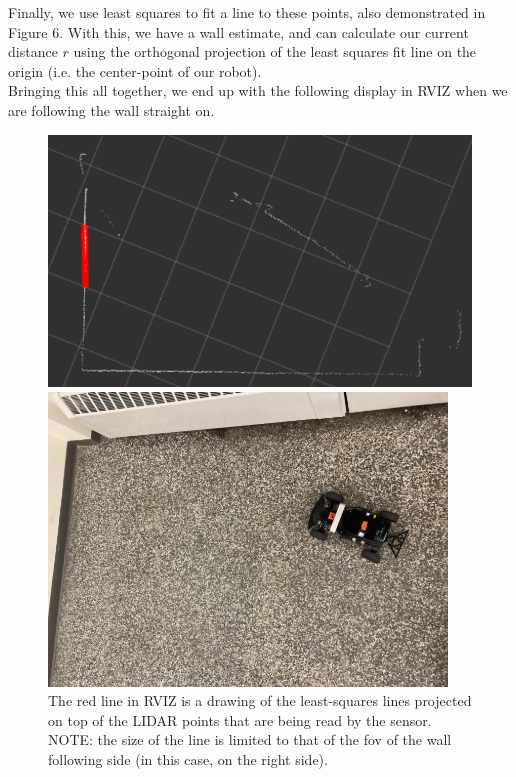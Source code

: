 \documentclass{article}
\begin{document}
Finally, we use least squares to fit a line to these points, also demonstrated in Figure 6. With this, we have a wall estimate, and can calculate our current distance $r$ using the orthogonal projection of the least squares fit line on the origin (i.e. the center-point of our robot).\\

Bringing this all together, we end up with the following display in RVIZ when we are following the wall straight on.\\

\begin{figure}[!h]
   \begin{minipage}{0.55\textwidth}
     \centering
     \includegraphics[width=1.0\linewidth]{scan_straight_rviz.png}
   \end{minipage}
   \begin{minipage}{0.45\textwidth}
     \centering
     \includegraphics[width=1.0\linewidth]{scan_straight_car.png}
   \end{minipage}
   \caption{The red line in RVIZ is a drawing of the least-squares lines projected on top of the LIDAR points that are being read by the sensor. NOTE: the size of the line is limited to that of the fov of the wall following side (in this case, on the right side).}
\end{figure}
\end{document}
